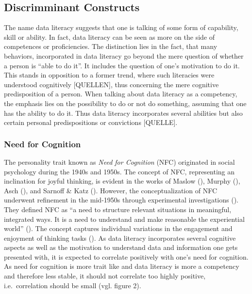 \documentclass[
  12pt,
  a4paper,
  twoside]{article}
\begin{document}
\subsection{Discrimminant Constructs}\label{discrimminant-constructs}

The name data literacy suggests that one is talking of some form of capability, skill or ability. In fact, data literacy can be seen as more on the side of competences or proficiencies. The distinction lies in the fact, that many behaviors, incorporated in data literacy go beyond the mere question of whether a person is ``able to do it''. It includes the question of one's motivation to do it. This stands in opposition to a former trend, where such literacies were understood cognitively {[}QUELLEN{]}, thus concerning the mere cognitive predisposition of a person. When talking about data literacy as a competency, the emphasis lies on the possibility to do or not do something, assuming that one has the ability to do it. Thus data literacy incorporates several abilities but also certain personal predispositions or convictions {[}QUELLE{]}.

\subsubsection{Need for Cognition}\label{need-for-cognition}

The personality trait known as \emph{Need for Cognition} (NFC) originated in social psychology during the 1940s and 1950s. The concept of NFC, representing an inclination for joyful thinking, is evident in the works of Maslow (), Murphy (), Asch (), and Sarnoff \& Katz (). However, the conceptualization of NFC underwent refinement in the mid-1950s through experimental investigations (). They defined NFC as ``a need to structure relevant situations in meaningful, integrated ways. It is a need to understand and make reasonable the experiential world'' (). The concept captures individual variations in the engagement and enjoyment of thinking tasks (). As data literacy incorporates several cognitive aspects as well as the motivation to understand data and information one gets presented with, it is expected to correlate positively with one's need for cognition. As need for cognition is more trait like and data literacy is more a competency and therefore less stable, it should not correlate too highly positive, i.e.~correlation should be small (vgl. figure 2).
\end{document}
